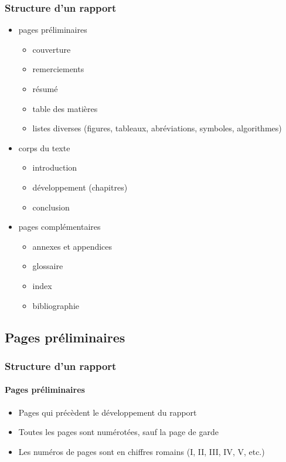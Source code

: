 \documentclass[xcolor=table]{beamer}
\begin{document}
\begin{frame}
\frametitle{Structure d'un rapport}

\begin{itemize}
	\item pages préliminaires
	\begin{itemize}
		\item couverture
		\item remerciements
		\item résumé
		\item table des matières
		\item listes diverses (figures, tableaux, abréviations, symboles, algorithmes)
	\end{itemize}

	\item corps du texte
	\begin{itemize}
		\item introduction
		\item développement (chapitres)
		\item conclusion
	\end{itemize}

	\item pages complémentaires
	\begin{itemize}
		\item annexes et appendices
		\item glossaire
		\item index
		\item bibliographie
	\end{itemize}

\end{itemize}

\end{frame}

\subsection{Pages préliminaires}

\begin{frame}
\frametitle{Structure d'un rapport}
\framesubtitle{Pages préliminaires}

\begin{itemize}
	\item Pages qui précèdent le développement du rapport
	\item Toutes les pages sont numérotées, sauf la page de garde
	\item Les numéros de pages sont en chiffres romains (I, II, III, IV, V, etc.) 
\end{itemize}

\end{frame}
\end{document}
